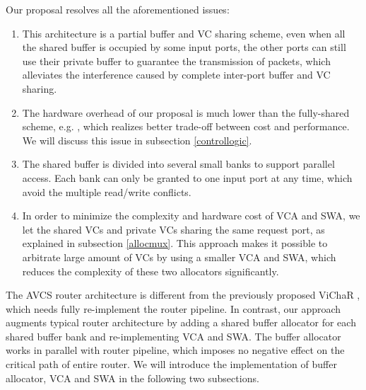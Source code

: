 \documentclass[paper]{ieice}
\begin{document}
Our proposal resolves all the aforementioned issues:
\begin{enumerate}
\item This architecture is a partial buffer and VC sharing scheme, even when all the shared buffer is occupied by some input ports, the other ports can still use their private buffer to guarantee the transmission of packets, which alleviates the interference caused by complete inter-port buffer and VC sharing.
\item The hardware overhead of our proposal is much lower than the fully-shared scheme, e.g. \cite{Neishaburi:2009:RAN:1531542.1531658}\cite{5770788}, which realizes better trade-off between cost and performance. We will discuss this issue in subsection \ref{controllogic}.
\item The shared buffer is divided into several small banks to support parallel access. Each bank can only be granted to one input port at any time, which avoid the multiple read/write conflicts.
\item In order to minimize the complexity and hardware cost of VCA and SWA, we let the shared VCs and private VCs sharing the same request port, as explained in subsection \ref{allocmux}. This approach makes it possible to arbitrate large amount of VCs by using a smaller VCA and SWA, which reduces the complexity of these two allocators significantly.
\end{enumerate}

The AVCS router architecture is different from the previously proposed ViChaR \cite{NPKV06}, which needs fully re-implement the router pipeline. In contrast, our approach augments typical router architecture \cite{DaTo01} by adding a shared buffer allocator for each shared buffer bank and re-implementing VCA and SWA. The buffer allocator works in parallel with router pipeline, which imposes no negative effect on the critical path of entire router. We will introduce the implementation of buffer allocator, VCA and SWA in the following two subsections.
\end{document}
